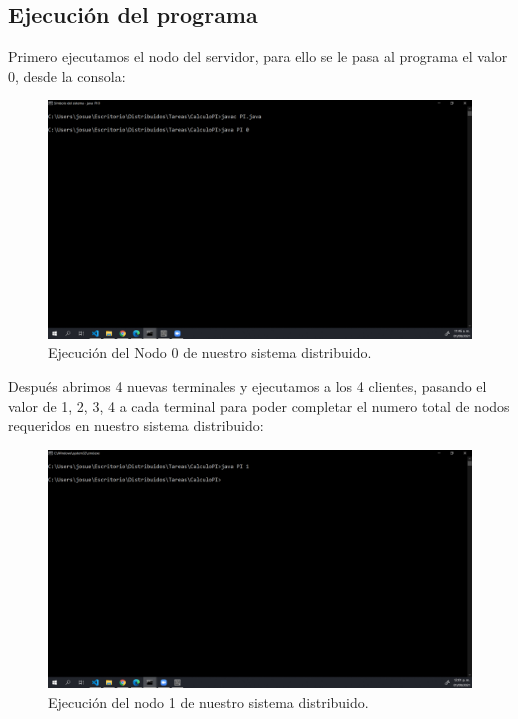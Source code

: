 \documentclass[11pt]{article}
\begin{document}
		\subsection{Ejecución del programa}
		Primero ejecutamos el nodo del servidor, para ello se le pasa al programa el valor 0, desde
la consola:
		\begin{figure}[H]
			\centering
			\includegraphics[scale=0.34]{resources/nodo0.png}
			\caption{Ejecución del Nodo 0 de nuestro sistema distribuido. }\label{fig:picture}
		\end{figure}
		Después abrimos 4 nuevas terminales y ejecutamos a los 4 clientes, pasando el valor de 1, 2, 3, 4 a cada terminal para poder completar el numero total de nodos requeridos en nuestro sistema distribuido:
		\begin{figure}[H]
			\centering
			\includegraphics[scale=0.34]{resources/nodo1.png}
			\caption{Ejecución del nodo 1 de nuestro sistema distribuido. }\label{fig:picture}
		\end{figure}
\end{document}
